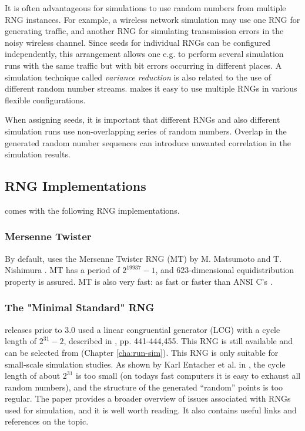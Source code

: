 It is often advantageous for simulations to use random numbers from
multiple RNG instances. For example, a wireless network simulation may use
one RNG for generating traffic, and another RNG for simulating transmission
errors in the noisy wireless channel. Since seeds for individual RNGs can
be configured independently, this arrangement allows one e.g. to perform
several simulation runs with the same traffic but with bit errors occurring
in different places. A simulation technique called \textit{variance
reduction} is also related to the use of different random number streams.
{\opp} makes it easy to use multiple RNGs in various flexible configurations.

When assigning seeds, it is important that different RNGs and also
different simulation runs use non-overlapping series of random numbers.
Overlap in the generated random number sequences can introduce unwanted
correlation in the simulation results.

\subsection{RNG Implementations}
\label{sec:sim-lib:rngs}

{\opp} comes with the following RNG implementations.

\subsubsection{Mersenne Twister}
\label{sec:sim-lib:mersenne-twister}

By default, {\opp} uses the Mersenne Twister RNG (MT) by M. Matsumoto and
T. Nishimura \cite{Matsumoto98}. MT has a period of $2^{19937}-1$,
and 623-dimensional equidistribution property is assured. MT is
also very fast: as fast or faster than ANSI C's .

\subsubsection{The "Minimal Standard" RNG}
\label{sec:sim-lib:minimal-standard-rng}

{\opp} releases prior to 3.0 used a linear congruential generator
(LCG) with a cycle length of $2^{31}-2$, described in
\cite{Jain91}, pp. 441-444,455. This RNG is still available
and can be selected from  (Chapter \ref{cha:run-sim}).
This RNG is only suitable for small-scale simulation studies.
As shown by Karl Entacher et al. in \cite{Entacher02},
the cycle length of about $2^{31}$ is too small (on todays
fast computers it is easy to exhaust all random numbers), and
the structure of the generated ``random'' points is too regular.
The \cite{Hellekalek98} paper provides a broader overview of issues
associated with RNGs used for simulation, and it is well worth reading.
It also contains useful links and references on the topic.

